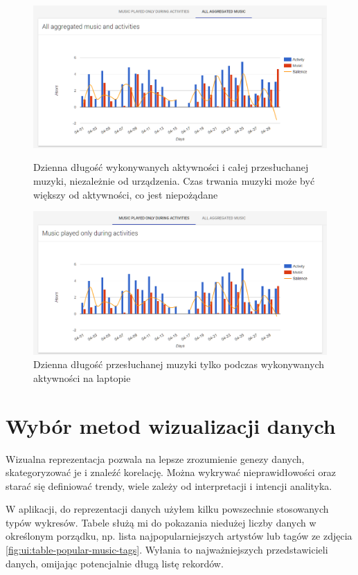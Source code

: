 \documentclass[openright]{xmgr}
\begin{document}
    \begin{figure}
        \includegraphics[width=\linewidth]{fig/ui/chart-music-all.png}
        \caption{Dzienna długość wykonywanych aktywności i całej przesłuchanej muzyki, niezależnie od urządzenia.
            Czas trwania muzyki może być większy od aktywności, co jest niepożądane}
        \label{fig:ui:chart-music-all}

        \includegraphics[width=\linewidth]{fig/ui/chart-music-only-during-activities.png}
        \caption{Dzienna długość przesłuchanej muzyki tylko podczas wykonywanych aktywności na laptopie}
        \label{fig:ui:chart-music-only-during-activities}
    \end{figure}

    \section{Wybór metod wizualizacji danych}

    Wizualna reprezentacja pozwala na lepsze zrozumienie genezy danych, skategoryzować je i znaleźć korelację.
    Można wykrywać nieprawidłowości oraz starać się definiować trendy, wiele zależy od interpretacji i intencji analityka.
    \cite{charts:excel-comparsion}

    W aplikacji, do reprezentacji danych użyłem kilku powszechnie stosowanych typów wykresów.
    Tabele służą mi do pokazania niedużej liczby danych w określonym porządku,
    np. lista najpopularniejszych artystów lub tagów ze zdjęcia \ref{fig:ui:table-popular-music-tags}.
    Wyłania to najważniejszych przedstawicieli danych, omijając potencjalnie długą listę rekordów.
\end{document}

